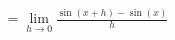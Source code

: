 \documentclass[preview]{standalone}
\begin{document}
\begin{align*}
= \lim_{h \to 0} \frac{\sin(x + h) - \sin(x)}{h}
\end{align*}
\end{document}
